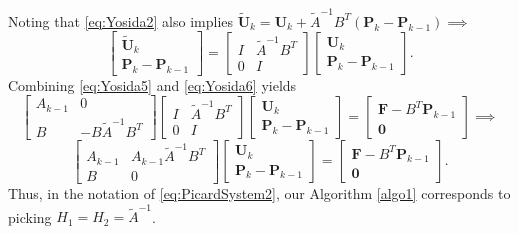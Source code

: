\documentclass[3p]{elsarticle}
\def\V#1{\mathbf{#1}}
\def\Vt#1{\mathbf{\tilde{#1}}}
\begin{document}
Noting that \eqref{eq:Yosida2} also implies
$\Vt{U}_k = \V{U}_k + \widetilde{A}^{-1} B^T \left(\V{P}_k - \V{P}_{k-1} \right) \implies$
\begin{equation}\label{eq:Yosida6}
\begin{bmatrix} 
\Vt{U}_k \\ 
\V{P}_k - \V{P}_{k-1} 
\end{bmatrix} = 
\begin{bmatrix} 
I & \widetilde{A}^{-1} B^T \\
0 & I 
\end{bmatrix} 
\begin{bmatrix} \V{U}_k  \\ 
\V{P}_k - \V{P}_{k-1} 
\end{bmatrix}.
\end{equation}
Combining \eqref{eq:Yosida5} and \eqref{eq:Yosida6} yields
\begin{equation}\label{eq:Yosida7}
\begin{bmatrix} 
A_{k-1} & 0 \\ 
B &  -B\widetilde{A}^{-1} B^T 
\end{bmatrix}
\begin{bmatrix} 
I & \widetilde{A}^{-1} B^T \\
0 & I 
\end{bmatrix} 
\begin{bmatrix} \V{U}_k  \\ 
\V{P}_k - \V{P}_{k-1} 
\end{bmatrix}
= \begin{bmatrix} \V{F} - B^T \V{P}_{k-1} \\ \V{0} \end{bmatrix} \implies
\end{equation}
\begin{equation}\label{eq:Yosida8}
\begin{bmatrix} 
A_{k-1} & A_{k-1}\widetilde{A}^{-1} B^T \\ 
B &  0 
\end{bmatrix}
\begin{bmatrix} \V{U}_k  \\ 
\V{P}_k - \V{P}_{k-1} 
\end{bmatrix}
= \begin{bmatrix} \V{F} - B^T \V{P}_{k-1} \\ \V{0} \end{bmatrix}. 
\end{equation}
Thus, in the notation of \eqref{eq:PicardSystem2}, our Algorithm \ref{algo1} corresponds to picking $H_1=H_2 = \widetilde{A}^{-1}$. 
\end{document}
